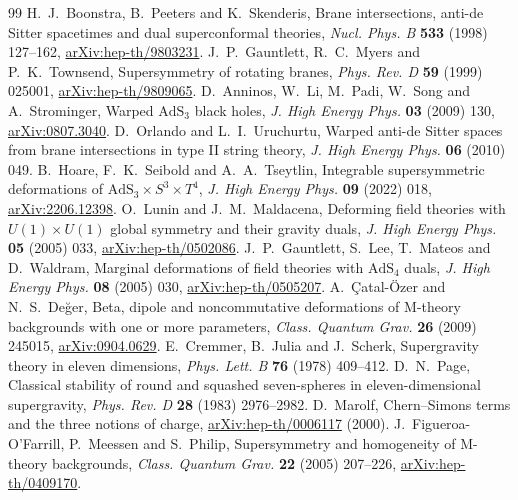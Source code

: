 \documentclass[11pt,a4paper]{article}
\numberwithin{equation}{section}
\begin{document}
\begin{thebibliography}{99}
 H.~J.~Boonstra, B.~Peeters and K.~Skenderis,
Brane intersections, anti-de Sitter spacetimes and dual superconformal theories,
\emph{Nucl. Phys. B} \textbf{533} (1998) 127--162,
\href{https://arxiv.org/abs/hep-th/9803231}{arXiv:hep-th/9803231}.
 J.~P.~Gauntlett, R.~C.~Myers and P.~K.~Townsend,
Supersymmetry of rotating branes,
\emph{Phys. Rev. D} \textbf{59} (1999) 025001,
\href{https://arxiv.org/abs/hep-th/9809065}{arXiv:hep-th/9809065}.
 D.~Anninos, W.~Li, M.~Padi, W.~Song and A.~Strominger,
Warped $\mathrm{AdS}_3$ black holes,
\emph{J. High Energy Phys.} \textbf{03} (2009) 130,
\href{https://arxiv.org/abs/0807.3040}{arXiv:0807.3040}.
 D.~Orlando and L.~I.~Uruchurtu,
Warped anti-de Sitter spaces from brane intersections in type II string theory,
\emph{J. High Energy Phys.} \textbf{06} (2010) 049.
 B.~Hoare, F.~K.~Seibold and A.~A.~Tseytlin,
Integrable supersymmetric deformations of $\mathrm{AdS}_3\times S^3\times T^4$,
\emph{J. High Energy Phys.} \textbf{09} (2022) 018,
\href{https://arxiv.org/abs/2206.12398}{arXiv:2206.12398}.
 O.~Lunin and J.~M.~Maldacena,
Deforming field theories with $U(1)\times U(1)$ global symmetry and their gravity duals,
\emph{J. High Energy Phys.} \textbf{05} (2005) 033,
\href{https://arxiv.org/abs/hep-th/0502086}{arXiv:hep-th/0502086}.
 J.~P.~Gauntlett, S.~Lee, T.~Mateos and D.~Waldram,
Marginal deformations of field theories with $\mathrm{AdS}_4$ duals,
\emph{J. High Energy Phys.} \textbf{08} (2005) 030,
\href{https://arxiv.org/abs/hep-th/0505207}{arXiv:hep-th/0505207}.
 A.~\c{C}atal-\"Ozer and N.~S.~De\u{g}er,
Beta, dipole and noncommutative deformations of M-theory backgrounds with one or more parameters,
\emph{Class. Quantum Grav.} \textbf{26} (2009) 245015,
\href{https://arxiv.org/abs/0904.0629}{arXiv:0904.0629}.
 E.~Cremmer, B.~Julia and J.~Scherk,
Supergravity theory in eleven dimensions,
\emph{Phys. Lett. B} \textbf{76} (1978) 409--412.
 D.~N.~Page,
Classical stability of round and squashed seven-spheres in eleven-dimensional supergravity,
\emph{Phys. Rev. D} \textbf{28} (1983) 2976--2982.
 D.~Marolf,
Chern--Simons terms and the three notions of charge,
\href{https://arxiv.org/abs/hep-th/0006117}{arXiv:hep-th/0006117} (2000).
 J.~Figueroa-O'Farrill, P.~Meessen and S.~Philip,
Supersymmetry and homogeneity of M-theory backgrounds,
\emph{Class. Quantum Grav.} \textbf{22} (2005) 207--226,
\href{https://arxiv.org/abs/hep-th/0409170}{arXiv:hep-th/0409170}.
\end{thebibliography}
\end{document}
